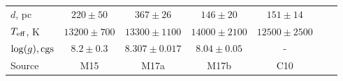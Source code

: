 \begin{landscape}
\begin{table*}
\begin{tabular}{lcccccc}
                \hline
                $d$, pc                     & $220\pm50$                & $367\pm26$                & $146\pm20$            & $151\pm14$            \\
                $T_{\rm eff}$, K            & $13200\pm700$             & $13300\pm1100$            & $14000\pm2100$        & $12500\pm2500$        \\
                $\log(g), {\rm cgs}$        & $8.2\pm0.3$               & $8.307\pm0.017$           & $8.04\pm0.05$         & -                     \\
                \hline
                Source                      & M15                       & M17a                      & M17b                  & C10                   \\
                \hline
                \hline
            \end{tabular}
        \end{table*}

\end{landscape}


